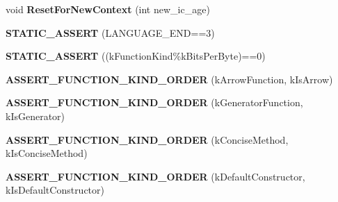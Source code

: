 \begin{DoxyCompactItemize}
\item 
void {\bfseries Reset\+For\+New\+Context} (int new\+\_\+ic\+\_\+age)\hypertarget{classv8_1_1internal_1_1_shared_function_info_a27dc03d3247ee74eb9474733f73de667}{}\label{classv8_1_1internal_1_1_shared_function_info_a27dc03d3247ee74eb9474733f73de667}

\item 
{\bfseries S\+T\+A\+T\+I\+C\+\_\+\+A\+S\+S\+E\+RT} (L\+A\+N\+G\+U\+A\+G\+E\+\_\+\+E\+ND==3)\hypertarget{classv8_1_1internal_1_1_shared_function_info_ad5190e042ad91f72d0bb2e851a1ff35d}{}\label{classv8_1_1internal_1_1_shared_function_info_ad5190e042ad91f72d0bb2e851a1ff35d}

\item 
{\bfseries S\+T\+A\+T\+I\+C\+\_\+\+A\+S\+S\+E\+RT} ((k\+Function\+Kind\%k\+Bits\+Per\+Byte)==0)\hypertarget{classv8_1_1internal_1_1_shared_function_info_a8487b396f558f74e893d322155dcc563}{}\label{classv8_1_1internal_1_1_shared_function_info_a8487b396f558f74e893d322155dcc563}

\item 
{\bfseries A\+S\+S\+E\+R\+T\+\_\+\+F\+U\+N\+C\+T\+I\+O\+N\+\_\+\+K\+I\+N\+D\+\_\+\+O\+R\+D\+ER} (k\+Arrow\+Function, k\+Is\+Arrow)\hypertarget{classv8_1_1internal_1_1_shared_function_info_a1090830efe8c60b29930f550ed0b6a99}{}\label{classv8_1_1internal_1_1_shared_function_info_a1090830efe8c60b29930f550ed0b6a99}

\item 
{\bfseries A\+S\+S\+E\+R\+T\+\_\+\+F\+U\+N\+C\+T\+I\+O\+N\+\_\+\+K\+I\+N\+D\+\_\+\+O\+R\+D\+ER} (k\+Generator\+Function, k\+Is\+Generator)\hypertarget{classv8_1_1internal_1_1_shared_function_info_a720b3b04b09f3338063a493fb24ec8f6}{}\label{classv8_1_1internal_1_1_shared_function_info_a720b3b04b09f3338063a493fb24ec8f6}

\item 
{\bfseries A\+S\+S\+E\+R\+T\+\_\+\+F\+U\+N\+C\+T\+I\+O\+N\+\_\+\+K\+I\+N\+D\+\_\+\+O\+R\+D\+ER} (k\+Concise\+Method, k\+Is\+Concise\+Method)\hypertarget{classv8_1_1internal_1_1_shared_function_info_af16697e4438faa9a3b739879f55ab36b}{}\label{classv8_1_1internal_1_1_shared_function_info_af16697e4438faa9a3b739879f55ab36b}

\item 
{\bfseries A\+S\+S\+E\+R\+T\+\_\+\+F\+U\+N\+C\+T\+I\+O\+N\+\_\+\+K\+I\+N\+D\+\_\+\+O\+R\+D\+ER} (k\+Default\+Constructor, k\+Is\+Default\+Constructor)\hypertarget{classv8_1_1internal_1_1_shared_function_info_a6358a1188f9642b138805ca59509e8a1}{}\label{classv8_1_1internal_1_1_shared_function_info_a6358a1188f9642b138805ca59509e8a1}


\end{DoxyCompactItemize}
